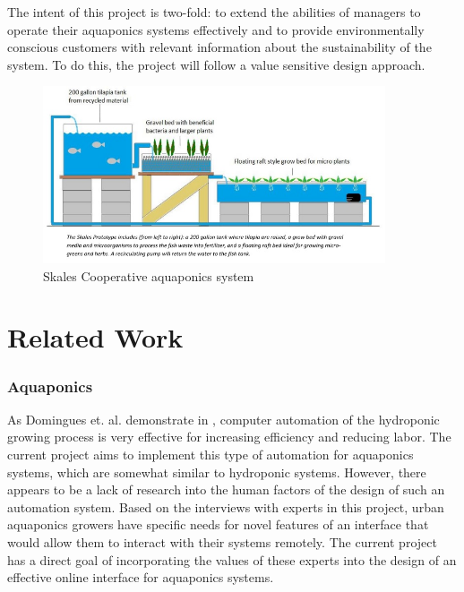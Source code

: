 \documentclass{sigchi}
\begin{document}
The intent of this project is two-fold: to extend the abilities of managers to operate their aquaponics systems effectively and to provide environmentally conscious customers with relevant information about the sustainability of the system. To do this, the project will follow a value sensitive design approach.

\begin{figure}
\centering
\includegraphics[width=0.9\textwidth]{systemDiagram}
\caption{Skales Cooperative aquaponics system}
\label{fig:skales}
\end{figure}

\section{Related Work}
\subsubsection{Aquaponics}

As Domingues et. al. demonstrate in \cite{automated}, computer automation of the hydroponic growing process is very effective for increasing efficiency and reducing labor. The current project aims to implement this type of automation for aquaponics systems, which are somewhat similar to hydroponic systems. However, there appears to be a lack of research into the human factors of the design of such an automation system. Based on the interviews with experts in this project, urban aquaponics growers have specific needs for novel features of an interface that would allow them to interact with their systems remotely. The current project has a direct goal of incorporating the values of these experts into the design of an effective online interface for aquaponics systems. 
\end{document}
